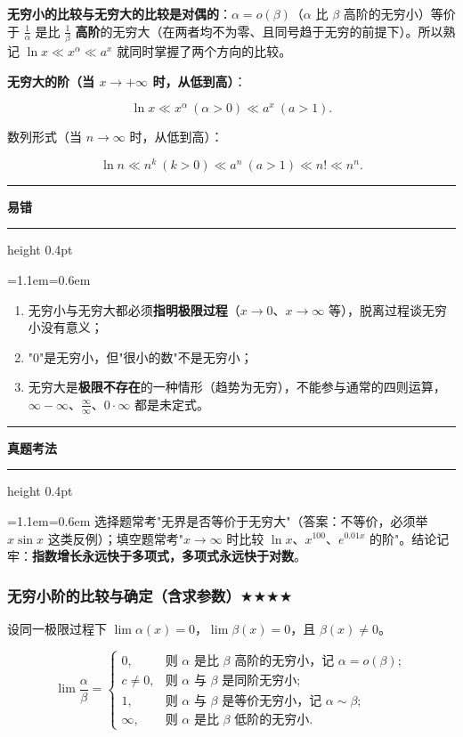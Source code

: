 \documentclass[11pt,openany,UTF8]{ctexbook}
\newcommand{\callouthead}[2]{%
  \par\addvspace{7pt}\noindent
  {\color{#1}\rule[-0.15em]{3pt}{1.05em}}\hspace{0.5em}%
  {\bfseries\color{#1}#2}\par\nobreak\vspace{-0.35em}%
  {\color{rulesep}\hrule height 0.4pt}\nobreak\vspace{0.45em}%
  \begingroup\small\setlength{\parindent}{0pt}%
  \leftskip=1.1em\rightskip=0.6em\noindent\ignorespaces}
\newcommand{\calloutend}{\par\endgroup\addvspace{7pt}}
\newenvironment{callwarn}[1]{\callouthead{warnbar}{#1}}{\calloutend}
\newenvironment{callexam}[1]{\callouthead{exambar}{#1}}{\calloutend}
\begin{document}
\textbf{无穷小的比较与无穷大的比较是对偶的}：$\alpha=o(\beta)$（$\alpha$ 比 $\beta$ 高阶的无穷小）等价于 $\frac1\alpha$ 是比 $\frac1\beta$ \textbf{高阶}的无穷大（在两者均不为零、且同号趋于无穷的前提下）。所以熟记 $\ln x\ll x^{\alpha}\ll a^{x}$ 就同时掌握了两个方向的比较。

\textbf{无穷大的阶（当 $x\to+\infty$ 时，从低到高）}：

\[\ln x \ll x^{\alpha}\ (\alpha>0)\ll a^{x}\ (a>1).\]

数列形式（当 $n\to\infty$ 时，从低到高）：

\[\ln n \ll n^{k}\ (k>0)\ll a^{n}\ (a>1)\ll n!\ll n^{n}.\]

\begin{callwarn}{易错}
\begin{enumerate}
\item 无穷小与无穷大都必须\textbf{指明极限过程}（$x\to 0$、$x\to\infty$ 等），脱离过程谈无穷小没有意义；
\item "$0$"是无穷小，但"很小的数"不是无穷小；
\item 无穷大是\textbf{极限不存在}的一种情形（趋势为无穷），不能参与通常的四则运算，$\infty-\infty$、$\frac{\infty}{\infty}$、$0\cdot\infty$ 都是未定式。
\end{enumerate}
\end{callwarn}

\begin{callexam}{真题考法}
选择题常考"无界是否等价于无穷大"（答案：不等价，必须举 $x\sin x$ 这类反例）；填空题常考"$x\to\infty$ 时比较 $\ln x$、$x^{100}$、$e^{0.01x}$ 的阶"。结论记牢：\textbf{指数增长永远快于多项式，多项式永远快于对数}。

\end{callexam}

\subsubsection{无穷小阶的比较与确定（含求参数）$\bigstar$$\bigstar$$\bigstar$$\bigstar$}

设同一极限过程下 $\lim\alpha(x)=0$，$\lim\beta(x)=0$，且 $\beta(x)\ne 0$。

\[\lim\frac{\alpha}{\beta}=
\begin{cases}
0, & \text{则 } \alpha \text{ 是比 } \beta \text{ 高阶的无穷小，记 } \alpha=o(\beta);\\
c\ne 0, & \text{则 } \alpha \text{ 与 } \beta \text{ 是同阶无穷小};\\
1, & \text{则 } \alpha \text{ 与 } \beta \text{ 是等价无穷小，记 } \alpha\sim\beta;\\
\infty, & \text{则 } \alpha \text{ 是比 } \beta \text{ 低阶的无穷小}.
\end{cases}\]
\end{document}
